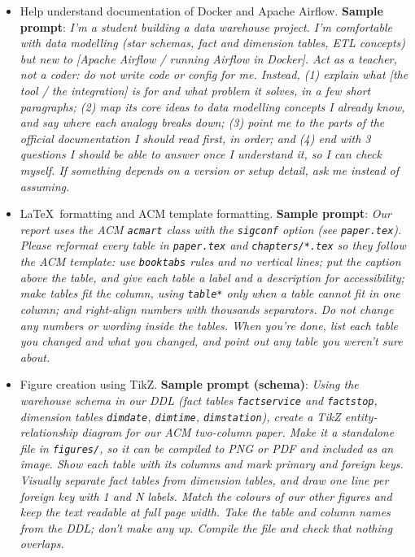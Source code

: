 \documentclass[sigconf, pbalance]{acmart}
\renewcommand{\_}{\oldunderscore\allowbreak}}
\begin{document}
\begin{itemize}
  \item Help understand documentation of Docker and Apache Airflow.
  \textbf{Sample prompt}: \emph{I'm a student building a data warehouse project. I'm comfortable with data modelling (star schemas, fact and dimension tables, ETL concepts) but new to [Apache Airflow / running Airflow in Docker]. Act as a teacher, not a coder: do not write code or config for me. Instead, (1) explain what [the tool / the integration] is for and what problem it solves, in a few short paragraphs; (2) map its core ideas to data modelling concepts I already know, and say where each analogy breaks down; (3) point me to the parts of the official documentation I should read first, in order; and (4) end with 3 questions I should be able to answer once I understand it, so I can check myself. If something depends on a version or setup detail, ask me instead of assuming.}
  \item \LaTeX~formatting and ACM template formatting.
  \textbf{Sample prompt}: \emph{Our report uses the ACM \texttt{acmart} class with the \texttt{sigconf} option (see \texttt{paper.tex}). Please reformat every table in \texttt{paper.tex} and \texttt{chapters/*.tex} so they follow the ACM template: use \texttt{booktabs} rules and no vertical lines; put the caption above the table, and give each table a label and a description for accessibility; make tables fit the column, using \texttt{table*} only when a table cannot fit in one column; and right-align numbers with thousands separators. Do not change any numbers or wording inside the tables. When you're done, list each table you changed and what you changed, and point out any table you weren't sure about.}
  \item Figure creation using TikZ.
  \textbf{Sample prompt (schema)}: \emph{Using the warehouse schema in our DDL (fact tables \texttt{fact\_service} and \texttt{fact\_stop}, dimension tables \texttt{dim\_date}, \texttt{dim\_time}, \texttt{dim\_station}), create a TikZ entity-relationship diagram for our ACM two-column paper. Make it a standalone file in \texttt{figures/}, so it can be compiled to PNG or PDF and included as an image. Show each table with its columns and mark primary and foreign keys. Visually separate fact tables from dimension tables, and draw one line per foreign key with 1 and N labels. Match the colours of our other figures and keep the text readable at full page width. Take the table and column names from the DDL; don't make any up. Compile the file and check that nothing overlaps.}


\end{itemize}
\end{document}
